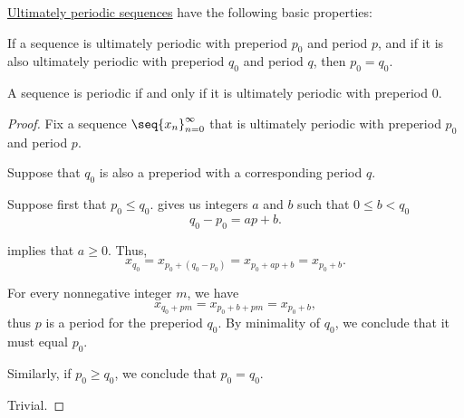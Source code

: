 \begin{proposition}\label{thm:def:ultimately_periodic_sequence}
  \hyperref[def:ultimately_periodic_sequence]{Ultimately periodic sequences} have the following basic properties:
  \begin{thmenum}
     If a sequence is ultimately periodic with preperiod \( p_0 \) and period \( p \), and if it is also ultimately periodic with preperiod \( q_0 \) and period \( q \), then \( p_0 = q_0 \).

     A sequence is periodic if and only if it is ultimately periodic with preperiod \( 0 \).
  \end{thmenum}
\end{proposition}
\begin{proof}
  Fix a sequence \( \seq{ x_n }_{n=0}^\infty \) that is ultimately periodic with preperiod \( p_0 \) and period \( p \).

   Suppose that \( q_0 \) is also a preperiod with a corresponding period \( q \).

  Suppose first that \( p_0 \leq q_0 \).  gives us integers \( a \) and \( b \) such that \( 0 \leq b < q_0 \)
  \begin{equation*}
    q_0 - p_0 = ap + b.
  \end{equation*}

   implies that \( a \geq 0 \). Thus,
  \begin{equation*}
    x_{q_0} = x_{p_0 + (q_0 - p_0)} = x_{p_0 + ap + b} = x_{p_0 + b}.
  \end{equation*}

  For every nonnegative integer \( m \), we have
  \begin{equation*}
    x_{q_0 + pm} = x_{p_0 + b + pm} = x_{p_0 + b},
  \end{equation*}
  thus \( p \) is a period for the preperiod \( q_0 \). By minimality of \( q_0 \), we conclude that it must equal \( p_0 \).

  Similarly, if \( p_0 \geq q_0 \), we conclude that \( p_0 = q_0 \).

   Trivial.
\end{proof}
